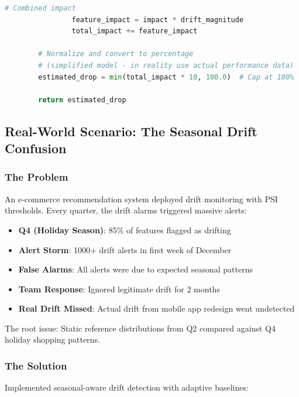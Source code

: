 \begin{lstlisting}[language=Python, caption={Causal Drift Analyzer with Root Cause Identification}]
                # Combined impact
                feature_impact = impact * drift_magnitude
                total_impact += feature_impact

        # Normalize and convert to percentage
        # (simplified model - in reality use actual performance data)
        estimated_drop = min(total_impact * 10, 100.0)  # Cap at 100%

        return estimated_drop
\end{lstlisting}

\subsection{Real-World Scenario: The Seasonal Drift Confusion}

\subsubsection{The Problem}

An e-commerce recommendation system deployed drift monitoring with PSI thresholds. Every quarter, the drift alarms triggered massive alerts:

\begin{itemize}
    \item \textbf{Q4 (Holiday Season)}: 85\% of features flagged as drifting
    \item \textbf{Alert Storm}: 1000+ drift alerts in first week of December
    \item \textbf{False Alarms}: All alerts were due to expected seasonal patterns
    \item \textbf{Team Response}: Ignored legitimate drift for 2 months
    \item \textbf{Real Drift Missed}: Actual drift from mobile app redesign went undetected
\end{itemize}

The root issue: Static reference distributions from Q2 compared against Q4 holiday shopping patterns.

\subsubsection{The Solution}

Implemented seasonal-aware drift detection with adaptive baselines:

